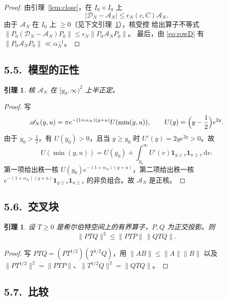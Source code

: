 \documentclass[12pt,a4paper]{amsart}
\numberwithin{equation}{section}
\theoremstyle{plain}
\newtheorem{lemma}[theorem]{引理}
\theoremstyle{definition}
\newcommand{\dd}{\,\mathrm{d}}
\begin{document}
\begin{proof}
由引理~\ref{lem:close}，在 $I_0\times I_0$ 上
\[
 |\mathscr D_N-\mathscr A_N|\le\epsilon_N(c,C)\mathscr A_N .
\]
由于 $\mathscr A_N$ 在 $I_0$ 上 $\ge0$（见下文引理~\ref{lem:positive}），核受控
给出算子不等式
$\|P_0(\mathcal D_N-\mathscr A_N)P_0\|\le\epsilon_N\|P_0\mathscr A_NP_0\|$。
最后，由 \eqref{eq:rowD} 有 $\|P_0\mathscr A_NP_0\|\ll\alpha_N^{-1}$。
\end{proof}

\subsection*{5.5.\ 模型的正性}

\begin{lemma}\label{lem:positive}
核 $\mathscr A_N$ 在 $[y_0,\infty)^2$ 上半正定。
\end{lemma}

\begin{proof}
写
\[
 \mathscr A_N(y,u)=\pi e^{-(1+\alpha_N)(y+u)}U(\min(y,u)),
 \qquad U(y)=\Bigl(y-\frac12\Bigr)e^{2y}.
\]
由于 $y_0>\frac12$，有 $U(y_0)>0$，且当 $y\ge y_0$ 时 $U'(y)=2ye^{2y}>0$。故
\[
 U(\min(y,u))=U(y_0)+\int_{y_0}^{\infty}U'(v)\mathbf 1_{y\ge v}\mathbf 1_{u\ge v}\dd v .
\]
第一项给出秩一核 $U(y_0)e^{-(1+\alpha_N)(y+u)}$，第二项给出秩一核
$e^{-(1+\alpha_N)(y+u)}\mathbf 1_{y\ge v}\mathbf 1_{u\ge v}$ 的非负组合。故
$\mathscr A_N$ 是正核。
\end{proof}

\subsection*{5.6.\ 交叉块}

\begin{lemma}\label{lem:cross}
设 $T\ge0$ 是希尔伯特空间上的有界算子，$P,Q$ 为正交投影。则
\begin{equation}\label{eq:cross}
 \|PTQ\|^2\le\|PTP\|\,\|QTQ\| .
\end{equation}
\end{lemma}

\begin{proof}
写 $PTQ=(P T^{1/2})(T^{1/2}Q)$，用 $\|AB\|\le\|A\|\|B\|$ 以及
$\|PT^{1/2}\|^2=\|PTP\|$、$\|T^{1/2}Q\|^2=\|QTQ\|$。
\end{proof}

\subsection*{5.7.\ 比较}
\end{document}
